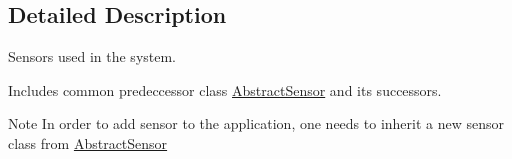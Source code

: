 \subsection{Detailed Description}
Sensors used in the system. 

Includes common predeccessor class \hyperlink{classAbstractSensor}{Abstract\+Sensor} and its successors.

\begin{DoxyNote}{Note}
In order to add sensor to the application, one needs to inherit a new sensor class from \hyperlink{classAbstractSensor}{Abstract\+Sensor} 
\end{DoxyNote}
